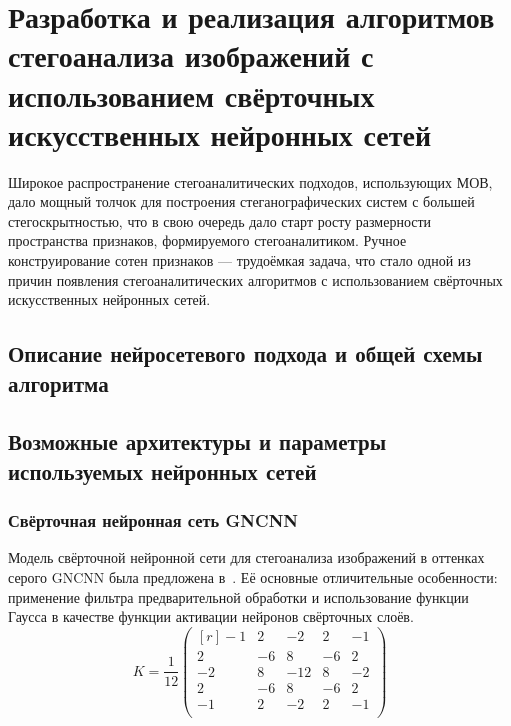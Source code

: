
\section{Разработка и реализация алгоритмов стегоанализа изображений с использованием свёрточных искусственных нейронных сетей}

Широкое распространение стегоаналитических подходов, использующих МОВ, дало мощный толчок для построения стеганографических систем с большей стегоскрытностью, что в свою очередь дало старт росту размерности пространства признаков, формируемого стегоаналитиком. Ручное конструирование сотен признаков --- трудоёмкая задача, что стало одной из причин появления стегоаналитических алгоритмов с использованием свёрточных искусственных нейронных сетей.

\subsection{Описание нейросетевого подхода и общей схемы алгоритма}



\subsection{Возможные архитектуры и параметры используемых нейронных сетей}

\subsubsection{Свёрточная нейронная сеть GNCNN}

Модель свёрточной нейронной сети для стегоанализа изображений в оттенках серого GNCNN была предложена в~\cite{GNCNN}. Её основные отличительные особенности: применение фильтра предварительной обработки и использование функции Гаусса в качестве функции активации нейронов свёрточных слоёв.
\begin{equation}
\label{eq:GNCNNConvKernel}
K = \frac{1}{12}
\begin{pmatrix*}[r]
    -1 &  2 &    -2 &  2 & -1 \\
     2 & -6 &     8 & -6 &  2 \\
    -2 &  8 & -12 &  8 & -2 \\
     2 & -6 &     8 & -6 &  2 \\
    -1 &  2 &    -2 &  2 & -1 \\
\end{pmatrix*}
\end{equation}

